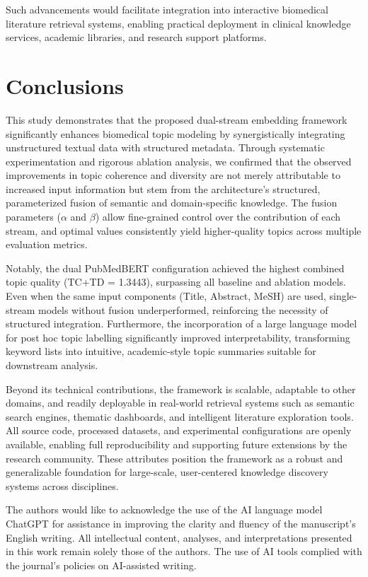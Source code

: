 \documentclass[authorproof,JACIII,researchpaper]{fujipressarticle}
\begin{document}
Such advancements would facilitate integration into interactive biomedical literature retrieval systems, enabling practical deployment in clinical knowledge services, academic libraries, and research support platforms.

\section{Conclusions}

This study demonstrates that the proposed dual-stream embedding framework significantly enhances biomedical topic modeling by synergistically integrating unstructured textual data with structured metadata. Through systematic experimentation and rigorous ablation analysis, we confirmed that the observed improvements in topic coherence and diversity are not merely attributable to increased input information but stem from the architecture's structured, parameterized fusion of semantic and domain-specific knowledge. The fusion parameters ($\alpha$ and $\beta$) allow fine-grained control over the contribution of each stream, and optimal values consistently yield higher-quality topics across multiple evaluation metrics.

Notably, the dual PubMedBERT configuration achieved the highest combined topic quality (TC+TD = 1.3443), surpassing all baseline and ablation models. Even when the same input components (Title, Abstract, MeSH) are used, single-stream models without fusion underperformed, reinforcing the necessity of structured integration. Furthermore, the incorporation of a large language model for post hoc topic labelling significantly improved interpretability, transforming keyword lists into intuitive, academic-style topic summaries suitable for downstream analysis.

Beyond its technical contributions, the framework is scalable, adaptable to other domains, and readily deployable in real-world retrieval systems such as semantic search engines, thematic dashboards, and intelligent literature exploration tools. All source code, processed datasets, and experimental configurations are openly available, enabling full reproducibility and supporting future extensions by the research community. These attributes position the framework as a robust and generalizable foundation for large-scale, user-centered knowledge discovery systems across disciplines.

\acknowledgments
The authors would like to acknowledge the use of the AI language model ChatGPT for assistance in improving the clarity and fluency of the manuscript's English writing. All intellectual content, analyses, and interpretations presented in this work remain solely those of the authors. The use of AI tools complied with the journal's policies on AI-assisted writing.
\end{document}
